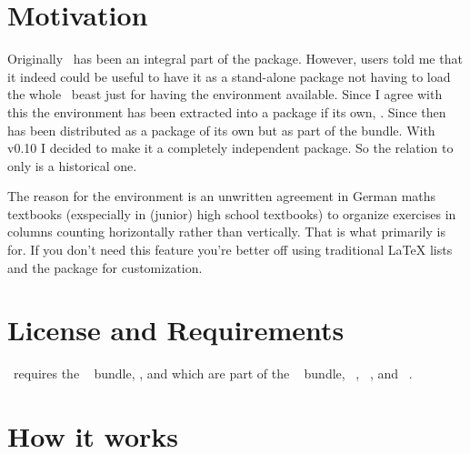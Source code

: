 \documentclass[load-preamble+]{cnltx-doc}
\begin{document}
\section{Motivation}
Originally \Tasks\ has been an integral part of the
\ExSheets{} package.  However, users told me that it indeed
could be useful to have it as a stand-alone package not having to load the
whole \ExSheets\ beast just for having the  environment available.
Since I agree with this the environment has been extracted into a package if
its own, \Tasks.  Since then \Tasks{} has been distributed as a package of its
own but as part of the \ExSheets{} bundle.  With v0.10 I
decided to make it a completely independent package.  So the relation to
\ExSheets{} only is a historical one.

The reason for the  environment is an unwritten agreement in German
maths textbooks (exspecially in (junior) high school textbooks) to organize
exercises in columns counting horizontally rather than vertically.  That is
what  primarily is for. If you don't need this feature you're
better off using traditional \LaTeX{} lists and the  package for
customization.

\section{License and Requirements}\label{sec:license}
\license

\Tasks\ requires the ~\cite{bnd:l3kernel} bundle,
,  and  which are
part of the ~\cite{bnd:l3packages} bundle,
~\cite{pkg:epic}, ~\cite{pkg:cntformats}, and
~\cite{pkg:environ}.


\section{How it works}
\end{document}
